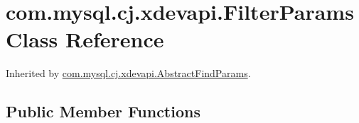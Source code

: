 \hypertarget{classcom_1_1mysql_1_1cj_1_1xdevapi_1_1_filter_params}{}\section{com.\+mysql.\+cj.\+xdevapi.\+Filter\+Params Class Reference}
\label{classcom_1_1mysql_1_1cj_1_1xdevapi_1_1_filter_params}


Inherited by \mbox{\hyperlink{classcom_1_1mysql_1_1cj_1_1xdevapi_1_1_abstract_find_params}{com.\+mysql.\+cj.\+xdevapi.\+Abstract\+Find\+Params}}.

\subsection*{Public Member Functions}
